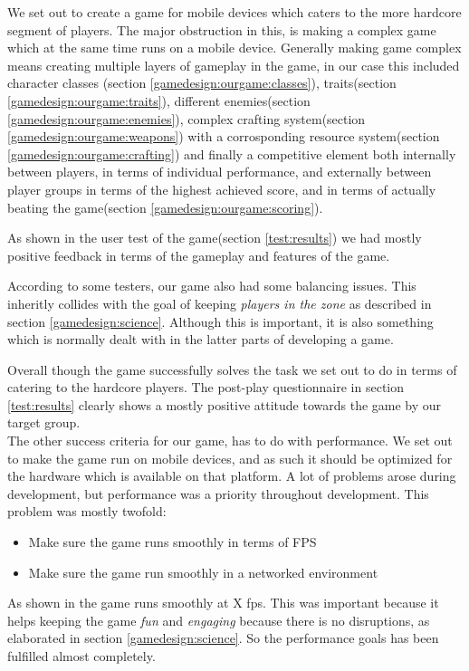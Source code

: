 We set out to create a game for mobile devices which caters to the more hardcore segment of players. The major obstruction in this, is making a complex game which at the same time runs on a mobile device. Generally making  game complex means creating multiple layers of gameplay in the game, in our case this included character classes (section \ref{gamedesign:ourgame:classes}), traits(section \ref{gamedesign:ourgame:traits}), different enemies(section \ref{gamedesign:ourgame:enemies}), complex crafting system(section \ref{gamedesign:ourgame:weapons}) with a corrosponding resource system(section \ref{gamedesign:ourgame:crafting}) and finally a competitive element both internally between players, in terms of individual performance, and externally between player groups in terms of the highest achieved score, and in terms of actually beating the game(section \ref{gamedesign:ourgame:scoring}).

As shown in the user test of the game(section \ref{test:results}) we had mostly positive feedback in terms of the gameplay and features of the game.

According to some testers, our game also had some balancing issues. This inheritly collides with the goal of keeping \emph{players in the zone} as described in section \ref{gamedesign:science}. Although this is important, it is also something which is normally dealt with in the latter parts of developing a game.

Overall though the game successfully solves the task we set out to do in terms of catering to the hardcore players.
The post-play questionnaire in section \ref{test:results} clearly shows a mostly positive attitude towards the game by our target group.\\

The other success criteria for our game, has to do with performance. We set out to make the game run on mobile devices, and as such it should be optimized for the hardware which is available on that platform. A lot of problems arose during development, but performance was a priority throughout development. This problem was mostly twofold:

\begin{itemize}
\item Make sure the game runs smoothly in terms of FPS 
\item Make sure the game run smoothly in a networked environment
\end{itemize}

As shown in  the game runs smoothly at X fps. This was important because it helps keeping the game \emph{fun} and \emph{engaging} because there is no disruptions, as elaborated in section \ref{gamedesign:science}.  So the performance goals has been fulfilled almost completely. 

